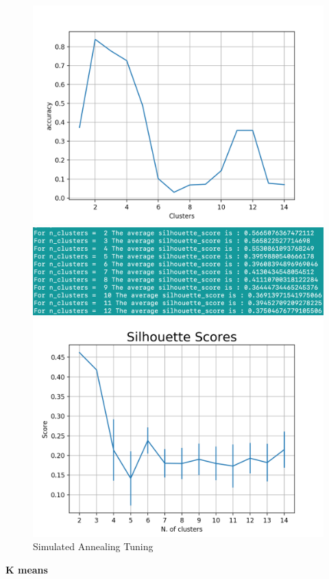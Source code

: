 \documentclass[a4paper,12pt]{article}
\begin{document}
\begin{figure}[!htb]
   \begin{minipage}{0.33\textwidth}
     \centering
     \includegraphics[width=.95\linewidth]{kmeans_ica_dataset1_accuracy}
   \end{minipage}\hfill
    \begin{minipage}{0.33\textwidth}
     \centering
     \includegraphics[width=.95\linewidth]{kmeans_ica_dataset1_sil}
     \end{minipage}\hfill
     \begin{minipage}{0.33\textwidth}
     \centering
     \includegraphics[width=.95\linewidth]{em_ica_dataset1_sil}
   \end{minipage}\hfill
 \caption { Simulated Annealing Tuning}
\end{figure}
\textbf{K means } 
\end{document}
